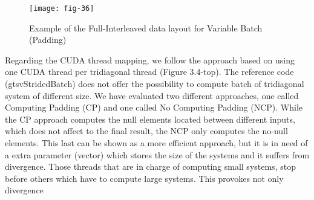     \vspace{1ex}
    \begin{figure}[htbp]
        \centering
        \texttt{[image: fig-36]}
        \caption{Example of the Full-Interleaved data layout for Variable Batch (Padding)}
        \label{fig:fig-36}
    \end{figure}

Regarding the CUDA thread mapping, we follow the approach based on using one
CUDA thread per tridiagonal thread (Figure 3.4-top). The reference code (gtsvStridedBatch) does not offer the possibility to compute batch of tridiagonal system of different
size. We have evaluated two different approaches, one called Computing Padding (CP)
and one called No Computing Padding (NCP). While the CP approach computes the
null elements located between different inputs, which does not affect to the final result,
the NCP only computes the no-null elements. This last can be shown as a more efficient
approach, but it is in need of a extra parameter (vector) which stores the size of the
systems and it suffers from divergence. Those threads that are in charge of computing
small systems, stop before others which have to compute large systems. This provokes
not only divergence





